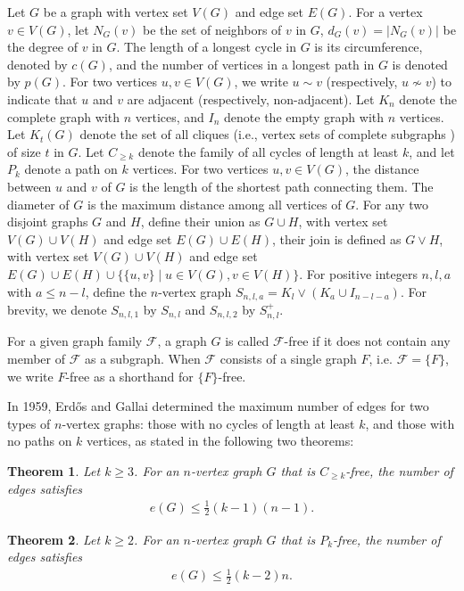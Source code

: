 \documentclass[preprint,12pt]{elsarticle}
\newtheorem{thm}{Theorem}[section]
\begin{document}
        Let $G$ be a graph with vertex set $V(G)$ and edge set $E(G)$.
        For a vertex $v \in V(G)$, let $N_G(v)$ be the set of neighbors of $v$ in $G$, $d_G(v)=|N_G(v)|$ be the degree of $v$ in $G$.
        The length of a longest cycle in $G$ is its circumference, denoted by $c(G)$, and the number of vertices in a longest path in $G$ is denoted by $p(G)$.
        For two vertices $u, v \in V(G)$, we write $u \sim v$ (respectively, $u \nsim v$) to indicate that $u$ and $v$ are adjacent (respectively, non-adjacent).
        Let $K_n$ denote the complete graph with $n$ vertices, and $I_n$ denote the empty graph with $n$ vertices.
        Let $K_t(G)$ denote the set of all cliques (i.e., vertex sets of complete subgraphs ) of size $t$ in $G$.
        Let $C_{\geq k}$ denote the family of all cycles of length at least $k$, and let $P_k$ denote a path on $k$ vertices.
        For two vertices $u, v \in V(G)$, the distance  between $u$ and $v$ of $G$ is the length of the shortest path connecting them. The diameter of $G$ is the maximum distance among all vertices of $G$.
        For any two disjoint graphs $G$ and $H$, define their union as $G \cup H$, with vertex set $V(G) \cup V(H)$ and edge set $E(G) \cup E(H)$, their join is defined as $G \vee H$, with vertex set $V(G) \cup V(H)$ and edge set $E(G) \cup E(H) \cup \{\{u,v\} \mid u \in V(G), v \in V(H)\}$.
        For positive integers $n, l, a$ with $a \leq n-l$, define the $n$-vertex graph $S_{n,l,a} = K_l \vee (K_a \cup I_{n-l-a})$. For brevity, we denote $S_{n,l,1}$ by $S_{n,l}$ and $S_{n,l,2}$ by $S_{n,l}^+$.





        For a given graph family $\mathcal{F}$, a graph $G $ is called $\mathcal{F} $-free if it does not contain any member of $\mathcal{F} $ as a subgraph. When $\mathcal{F}$ consists of a single graph $F$, i.e. $\mathcal{F}=\{F\}$, we write $F$-free as a shorthand for $\{F\}$-free.

        In 1959, Erd\H{o}s and Gallai \cite{Erdos1959} determined the maximum number of edges for two types of $n$-vertex graphs: those with no cycles of length at least $k$, and those with no paths on $k$ vertices, as stated in the following two theorems:
        \begin{thm}\label{erdos1}\cite{Erdos1959}
            Let $k \geq 3$. For an $n$-vertex graph $G$ that is $C_{\geq k}$-free, the number of edges satisfies
                \begin{align*}
                    e(G) \leq \frac{1}{2}(k-1)(n-1).
                \end{align*}
		\end{thm}
        \begin{thm}\label{erdos2}\cite{Erdos1959}
            Let $k \geq 2 $. For an $n$-vertex graph $G$ that is $P_{k}$-free, the number of edges satisfies
                \begin{align*}
                    e(G) \leq \frac{1}{2}(k-2)n.
                \end{align*}
		\end{thm}
\end{document}
